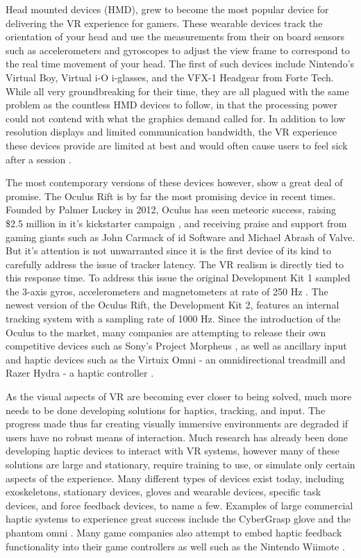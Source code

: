 Head mounted devices (HMD), grew to become the most popular device for
delivering the VR experience for gamers.  These wearable devices track the
orientation of your head and use the measurements from their on board sensors
such as accelerometers and gyroscopes to adjust the view frame to correspond to
the real time movement of your head.  The first of such devices include
Nintendo's Virtual Boy, Virtual i-O i-glasses, and the VFX-1 Headgear from Forte
Tech. While all very groundbreaking for their time, they are all plagued with
the same problem as the countless HMD devices to follow, in that the processing
power could not contend with what the graphics demand called for. In addition
to low resolution displays and limited communication bandwidth, the VR
experience these devices provide are limited at best and would often cause
users to feel sick after a session \cite{zachara2009challenges}.

The most contemporary versions of these devices however, show a great deal of
promise. The Oculus Rift \cite{website:oculusvr} is by far the most promising
device in recent times. Founded by Palmer Luckey in 2012, Oculus has seen
meteoric success, raising \$2.5 million in it's kickstarter
campaign \cite{website:kickstarterovr}, and receiving praise and support from
gaming giants such as John Carmack of id Software and Michael Abrash of Valve.
But it's attention is not unwarranted since it is the first device of its kind
to carefully address the issue of tracker latency. The VR realism is directly
tied to this response time. To address this issue the original Development Kit
1 sampled the 3-axis gyros, accelerometers and magnetometers at rate of 250 Hz
\cite{website:roadtovr}.  The newest version of the Oculus Rift, the
Development Kit 2, features an internal tracking system with a sampling rate of
1000 Hz. Since the introduction of the Oculus to the market, many companies are
attempting to release their own competitive devices such as Sony's Project
Morpheus \cite{website:sony}, as well as ancillary input and haptic devices
such as the Virtuix Omni - an omnidirectional treadmill and Razer Hydra -
a haptic controller \cite{website:razer}.

As the visual aspects of VR are becoming ever closer to being solved, much more
needs to be done developing solutions for haptics, tracking, and input.  The
progress made thus far creating visually immersive environments are degraded if
users have no robust means of interaction. Much research has already been done
developing haptic devices to interact with VR systems, however many of these
solutions are large and stationary, require training to use, or simulate only
certain aspects of the experience. Many different types of devices exist today,
including exoskeletons, stationary devices, gloves and wearable devices,
specific task devices, and force feedback devices, to name a few.  Examples of
large commercial haptic systems to experience great success include the
CyberGrasp glove \cite{website:cybergrasp} and the phantom omni
\cite{website:geomagic}. Many game companies also attempt to embed haptic
feedback functionality into their game controllers as well such as the Nintendo
Wiimote \cite{website:wiimote}. 

